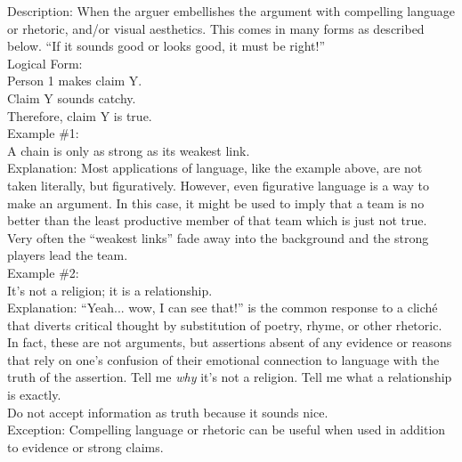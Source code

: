 \documentclass[a4paper,12pt,single,pdftex]{scrbook}
\begin{document}
  
    
      Description: When the arguer embellishes the argument with compelling language or rhetoric, and/or visual aesthetics. This comes in many forms as described below. “If it sounds good or looks good, it must be right!”
    \\

    
      Logical Form:
    \\

    
      Person 1 makes claim Y.
    \\

    
      Claim Y sounds catchy.
    \\

    
      Therefore, claim Y is true.
    \\

    
      Example \#1:
    \\

    
      A chain is only as strong as its weakest link.
    \\

    
      Explanation: Most applications of language, like the example above, are not taken literally, but figuratively.  However, even figurative language is a way to make an argument.  In this case, it might be used to imply that a team is no better than the least productive member of that team which is just not true.  Very often the “weakest links” fade away into the background and the strong players lead the team.
    \\

    
      Example \#2:
    \\

    
      It’s not a religion; it is a relationship.
    \\

    
      Explanation: “Yeah... wow, I can see that!” is the common response to a cliché that diverts critical thought by substitution of poetry, rhyme, or other rhetoric.  In fact, these are not arguments, but assertions absent of any evidence or reasons that rely on one's confusion of their emotional connection to language with the truth of the assertion.  Tell me {\it why} it’s not a religion.  Tell me what a relationship is exactly. 
    \\

    
      Do not accept information as truth because it sounds nice.
    \\

    
      Exception: Compelling language or rhetoric can be useful when used in addition to evidence or strong claims.
    \\
\end{document}
